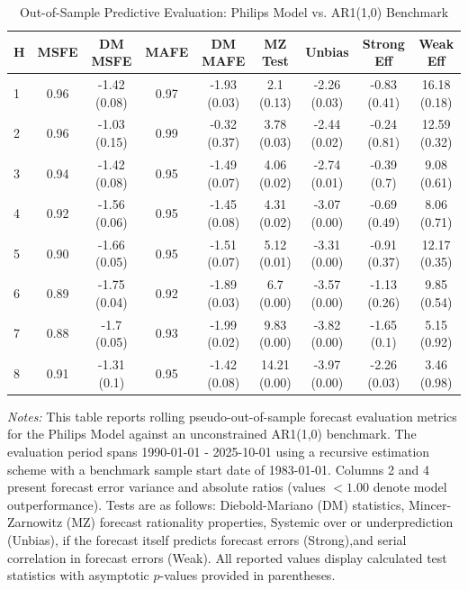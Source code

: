 \begin{table}[htbp]
\centering
\caption{Out-of-Sample Predictive Evaluation: Philips Model vs. AR1(1,0) Benchmark}
\label{tab:philips_model_evaluation}
\footnotesize
\begin{tabular}{l cccccccc}
\hline\hline
\rule{0pt}{3ex}
\textbf{H} & \textbf{MSFE} & \textbf{DM MSFE} & \textbf{MAFE} & \textbf{DM MAFE} & \textbf{MZ Test} & \textbf{Unbias} & \textbf{Strong Eff} & \textbf{Weak Eff} \\[0.5ex]
\hline
\rule{0pt}{2.5ex}
1 & 0.96 & -1.42 (0.08) & 0.97 & -1.93 (0.03) & 2.1 (0.13) & -2.26 (0.03) & -0.83 (0.41) & 16.18 (0.18) \\
2 & 0.96 & -1.03 (0.15) & 0.99 & -0.32 (0.37) & 3.78 (0.03) & -2.44 (0.02) & -0.24 (0.81) & 12.59 (0.32) \\
3 & 0.94 & -1.42 (0.08) & 0.95 & -1.49 (0.07) & 4.06 (0.02) & -2.74 (0.01) & -0.39 (0.7) & 9.08 (0.61) \\
4 & 0.92 & -1.56 (0.06) & 0.95 & -1.45 (0.08) & 4.31 (0.02) & -3.07 (0.00) & -0.69 (0.49) & 8.06 (0.71) \\
5 & 0.90 & -1.66 (0.05) & 0.95 & -1.51 (0.07) & 5.12 (0.01) & -3.31 (0.00) & -0.91 (0.37) & 12.17 (0.35) \\
6 & 0.89 & -1.75 (0.04) & 0.92 & -1.89 (0.03) & 6.7 (0.00) & -3.57 (0.00) & -1.13 (0.26) & 9.85 (0.54) \\
7 & 0.88 & -1.7 (0.05) & 0.93 & -1.99 (0.02) & 9.83 (0.00) & -3.82 (0.00) & -1.65 (0.1) & 5.15 (0.92) \\
8 & 0.91 & -1.31 (0.1) & 0.95 & -1.42 (0.08) & 14.21 (0.00) & -3.97 (0.00) & -2.26 (0.03) & 3.46 (0.98) \\
\hline\hline
\end{tabular}%
\par\smallskip
\parbox{\textwidth}{\scriptsize \textit{Notes:} This table reports rolling pseudo-out-of-sample forecast evaluation metrics for the Philips Model against an unconstrained AR1(1,0) benchmark. The evaluation period spans 1990-01-01 - 2025-10-01 using a recursive estimation scheme with a benchmark sample start date of 1983-01-01. Columns 2 and 4 present forecast error variance and absolute ratios (values $< 1.00$ denote model outperformance). Tests are as follows: Diebold-Mariano (DM) statistics, Mincer-Zarnowitz (MZ) forecast rationality properties, Systemic over or underprediction (Unbias), if the forecast itself predicts forecast errors (Strong),and serial correlation in forecast errors (Weak). All reported values display calculated test statistics with asymptotic $p$-values provided in parentheses.}
\end{table}
